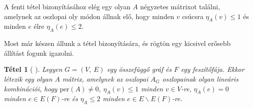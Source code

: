 \documentclass[12pt, a4paper]{report}
\newtheorem{tét}{Tétel}[section]
\theoremstyle{remark}
\theoremstyle{definition}
\begin{document}
A fenti tétel bizonyításához elég egy olyan $A$ négyzetes mátrixot találni, amelynek az oszlopai oly módon állnak elő, hogy minden $v$ csúcsra $\eta_A(v) \leq 1$ és minden $e$ élre $\eta_A(e) \leq 2$.

Most már készen állunk a tétel bizonyítására, és rögtön egy kicsivel erősebb állítást fogunk igazolni. 

\begin{tét} [\citeauthor{Wong2014} \cite{Wong2014}]
Legyen $G = (V,\ E)$ egy összefüggő gráf és $F$ egy feszítőfája. Ekkor létezik egy olyan $A$ mátrix, amelynek az oszlopai $A_G$ oszlopainak olyan lineáris kombinációi, hogy $\mathrm{per}(A) \neq 0$, $\eta_A(v) \leq 1$ minden $v \in V$-re, $\eta_A(e) = 0$ minden $e \in E(F)$-re és $\eta_A \leq 2$ minden $e \in E \smallsetminus E(F)$-re.
\end{tét}
\end{document}
